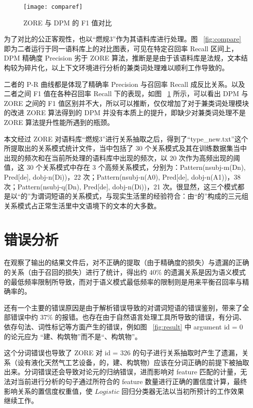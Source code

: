 \begin{figure}[h!]
\centering
\texttt{[image: comparef]}
\caption{ZORE 与 DPM 的 F1 值对比}\label{fig:comparef}
\end{figure}

为了对比的公正客观性，也以“燃规3”作为其语料库进行处理。图 ~\ref{fig:compare} 即为二者运行于同一语料库上的对比图表，可见在特定召回率 Recall 区间上，DPM 精确度 Precision 劣于 ZORE 算法，推断是是由于该语料库是法规，文本结构较为碎片化，以上下文环境进行分析的兼类词处理难以顺利工作导致的。

二者的 P-R 曲线都是体现了精确率 Precision 与召回率 Recall 成反比关系。以及二者之间 F1 值在各种召回率 Recall 下的表现，如图 ~\ref{fig:comparef} 所示，可以看出 DPM 与 ZORE 之间的 F1 值区别并不大，所以可以推断，仅仅增加了对于兼类词处理模块的改进 ZORE 算法得到的 DPM 并没有本质上的提升，即缺少对兼类词处理不是 ZORE 算法提升性能所遇到的瓶颈。

本文经过 ZORE 对语料库“燃规3”进行关系抽取之后，得到了“type\_new.txt”这个所提取出的关系模式统计文件，当中包括了 30 个关系模式及其在训练数据集当中出现的频次和在当前所处理的语料库中出现的频次，以 20 次作为高频出现的阈值，这 30 个关系模式中存在 3 个高频关系模式，分别为：Pattern(nsubj-m(Dn), Pred[de], dobj-n(Di))，22 次；Pattern(nsubj-n(A0), Pred[de], dobj-n(A1))，38 次；Pattern(nsubj-q(Dn), Pred[de], dobj-n(Di))，21 次。很显然，这三个模式都是以“的”为谓词短语的关系模式，与现实生活里的经验符合：由“的”构成的三元组关系模式占正常生活里中文语境下的文本的大多数。

\section{错误分析}
在观察了输出的结果文件后，对不正确的提取（由于精确度的损失）与遗漏的正确的关系（由于召回的损失）进行了统计，得出约 $40\%$ 的遗漏关系是因为语义模式的最低频率限制所导致，而对于语义模式最低频率的限制则是用来平衡召回率与精确率的。

还有一个主要的错误原因是由于解析错误导致的对谓词短语的错误鉴别，带来了全部错误中约 $37\%$ 的报错。也存在由于自然语言处理工具所导致的错误，有分词、依存句法、词性标记等方面产生的错误，例如图 ~\ref{fig:result} 中 argument id = 0 的论元应为 “建、构筑物”而不是“、构筑物”。

这个分词错误也导致了 ZORE 对 id = 326 的句子进行关系抽取时产生了遗漏，关系（设有液化天然气工艺设备，的，建、构筑物）应该在分词正确的前提下被抽取出来。分词错误还会导致对论元的归纳错误，进而影响对 feature 匹配的计量，无法对当前进行分析的句子通过所符合的 feature 数量进行正确的置信度计算，最终影响关系的置信度权重值，使 $Logistic$ 回归分类器无法以当初所预计的工作效果继续工作。


